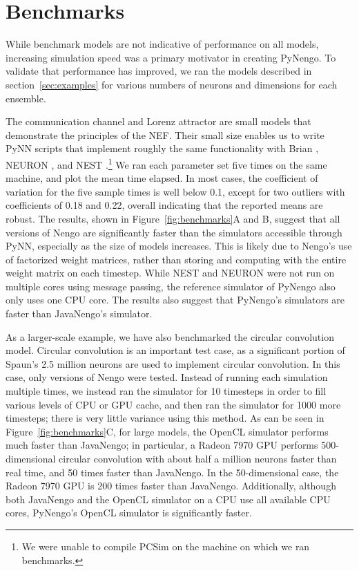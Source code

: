 \documentclass{frontiersSCNS}
\begin{document}
\section{Benchmarks} \label{sec:benchmark}


While benchmark models are not indicative
of performance on all models,
increasing simulation speed
was a primary motivator in creating PyNengo.
To validate that performance has improved,
we ran the models described in section~\ref{sec:examples}
for various numbers of neurons and dimensions
for each ensemble.

The communication channel and Lorenz attractor
are small models that demonstrate
the principles of the NEF.
Their small size enables us to write
PyNN scripts that implement roughly
the same functionality
with Brian \citep{goodman2009}, NEURON \citep{hines2009},
and NEST \citep{eppler2008}.\footnote{We
  were unable to compile PCSim \citep{pecevski2009} on the
  machine on which we ran benchmarks.}
We ran each parameter set five times
on the same machine,
and plot the mean time elapsed.
In most cases, the coefficient of variation
for the five sample times
is well below 0.1, except for two
outliers with coefficients of 0.18 and 0.22,
overall indicating that the reported means are robust.
The results, shown in Figure~\ref{fig:benchmarks}A and B,
suggest that all versions of Nengo are significantly
faster than the simulators accessible
through PyNN, especially
as the size of models increases.
This is likely due to Nengo's
use of factorized weight matrices,
rather than storing and computing with
the entire weight matrix
on each timestep.
While NEST and NEURON were not
run on multiple cores using message passing,
the reference simulator of PyNengo
also only uses one CPU core.
The results also suggest that PyNengo's
simulators are faster than JavaNengo's simulator.

As a larger-scale example,
we have also benchmarked
the circular convolution model.
Circular convolution is an important test case,
as a significant portion of Spaun's
2.5 million neurons are used to
implement circular convolution.
In this case, only versions of Nengo
were tested.
Instead of running each simulation multiple times,
we instead ran the simulator for 10 timesteps
in order to fill various levels of CPU or GPU cache,
and then ran the simulator for 1000 more timesteps;
there is very little variance using this method.
As can be seen in Figure~\ref{fig:benchmarks}C,
for large models, the OpenCL simulator
performs much faster than JavaNengo;
in particular, a Radeon 7970 GPU performs
500-dimensional circular convolution
with about half a million neurons
faster than real time,
and 50 times faster than JavaNengo.
In the 50-dimensional case,
the Radeon 7970 GPU is 200 times faster
than JavaNengo.
Additionally, although both JavaNengo
and the OpenCL simulator on a CPU
use all available CPU cores,
PyNengo's OpenCL simulator is significantly faster.
\end{document}
